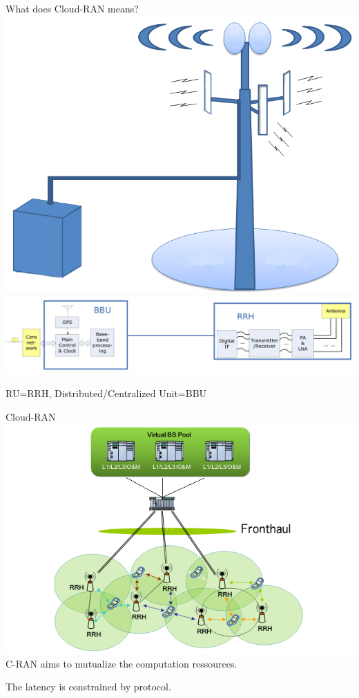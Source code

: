 \documentclass[10 pt]{beamer}
\begin{document}
\begin{frame}{What does Cloud-RAN means?}
  \centering
  \includegraphics[scale=0.2]{cloudbts.png}\\
  \includegraphics[scale=0.175]{BBURRH.png}
  
   RU=RRH, Distributed/Centralized Unit=BBU
\end{frame}



\begin{frame}{Cloud-RAN}
  \centering
  \includegraphics[scale=0.3]{CRAN}\\
  \vspace{0.5cm}
  \pause
  C-RAN aims to mutualize the computation ressources.
  
  \pause

  The latency is constrained by protocol.
  
  
\end{frame}
\end{document}
